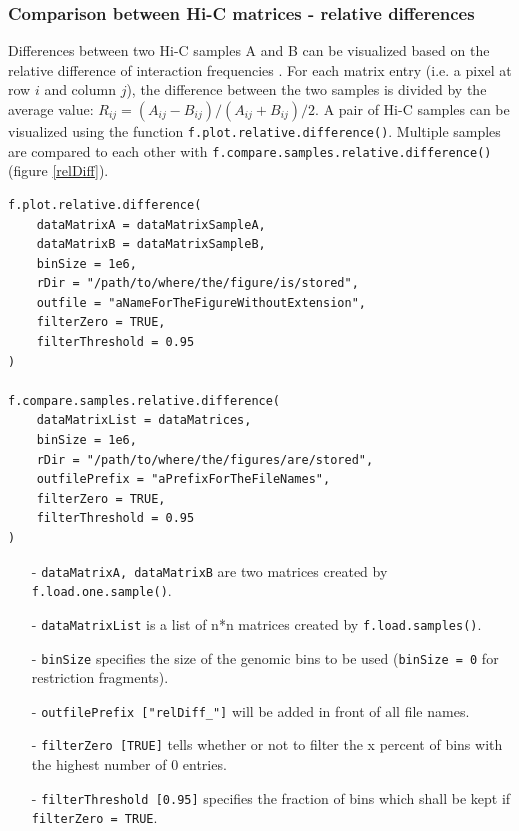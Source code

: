 \documentclass[a4paper,10pt]{article}
\begin{document}
\clearpage
\subsubsection{Comparison between Hi-C matrices - relative differences}
Differences between two Hi-C samples A and B can be visualized based on the relative difference of interaction frequencies \cite{2012_Moissiard}. For each matrix entry (i.e. a pixel at row $i$ and column $j$), the difference between the two samples is divided by the average value: $R_{ij}=(A_{ij}-B_{ij})/(A_{ij}+B_{ij})/2$. A pair of Hi-C samples can be visualized using the function \texttt{f.plot.relative.difference()}. Multiple samples are compared to each other with \texttt{f.compare.samples.relative.difference()} (figure \ref{relDiff}).
\begin{verbatim}
f.plot.relative.difference(
    dataMatrixA = dataMatrixSampleA,
    dataMatrixB = dataMatrixSampleB,
    binSize = 1e6,
    rDir = "/path/to/where/the/figure/is/stored",
    outfile = "aNameForTheFigureWithoutExtension",
    filterZero = TRUE,
    filterThreshold = 0.95
)

f.compare.samples.relative.difference(
    dataMatrixList = dataMatrices,
    binSize = 1e6,
    rDir = "/path/to/where/the/figures/are/stored",
    outfilePrefix = "aPrefixForTheFileNames",
    filterZero = TRUE,
    filterThreshold = 0.95
)
\end{verbatim}
\begin{itemize}
 \item[-] \texttt{dataMatrixA, dataMatrixB} are two matrices created by \texttt{f.load.one.sample()}.
 \item[-] \texttt{dataMatrixList} is a list of n*n matrices created by \texttt{f.load.samples()}. 
 \item[-] \texttt{binSize} specifies the size of the genomic bins to be used (\texttt{binSize = 0} for restriction fragments).
 \item[-] \texttt{outfilePrefix ["relDiff\_"]} will be added in front of all file names.
 \item[-] \texttt{filterZero [TRUE]} tells whether or not to filter the x percent of bins with the highest number of 0 entries.
 \item[-] \texttt{filterThreshold [0.95]} specifies the fraction of bins which shall be kept if \texttt{filterZero = TRUE}.
\end{itemize}
\end{document}

